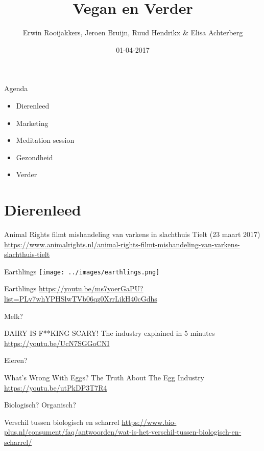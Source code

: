 \documentclass[presentation]{beamer}
\author{Erwin Rooijakkers, Jeroen Bruijn, Ruud Hendrikx \& Elisa Achterberg}
\date{01-04-2017}
\title{Vegan en Verder}
\begin{document}
\maketitle

\begin{frame}[label=sec-0-1]{Agenda}
\begin{itemize}
\item Dierenleed
\item Marketing
\item Meditation session
\item Gezondheid
\item Verder
\end{itemize}
\end{frame}

\section{Dierenleed}
\label{sec-1}

\begin{frame}[label=sec-1-1]{Animal Rights filmt mishandeling van varkens in slachthuis Tielt (23 maart 2017)}
\url{https://www.animalrights.nl/animal-rights-filmt-mishandeling-van-varkens-slachthuis-tielt}
\end{frame}

\begin{frame}[label=sec-1-2]{Earthlings}
\texttt{[image: ../images/earthlings.png]}

\begin{alertblock}{Earthlings}
\url{https://youtu.be/ms7yoerGaPU?list=PLv7whYPHSlwTVb06qz0XrrLikH40cGdhs}
\end{alertblock}
\end{frame}

\begin{frame}[label=sec-1-3]{Melk?}
\begin{alertblock}{DAIRY IS F**KING SCARY! The industry explained in 5 minutes}
\url{https://youtu.be/UcN7SGGoCNI}
\end{alertblock}
\end{frame}

\begin{frame}[label=sec-1-4]{Eieren?}
\begin{alertblock}{What's Wrong With Eggs? The Truth About The Egg Industry}
\url{https://youtu.be/utPkDP3T7R4}
\end{alertblock}
\end{frame}

\begin{frame}[label=sec-1-5]{Biologisch? Organisch?}
\begin{alertblock}{Verschil tussen biologisch en scharrel}
\url{https://www.bio-plus.nl/consument/faq/antwoorden/wat-is-het-verschil-tussen-biologisch-en-scharrel/}
\end{alertblock}
\end{frame}
\end{document}
